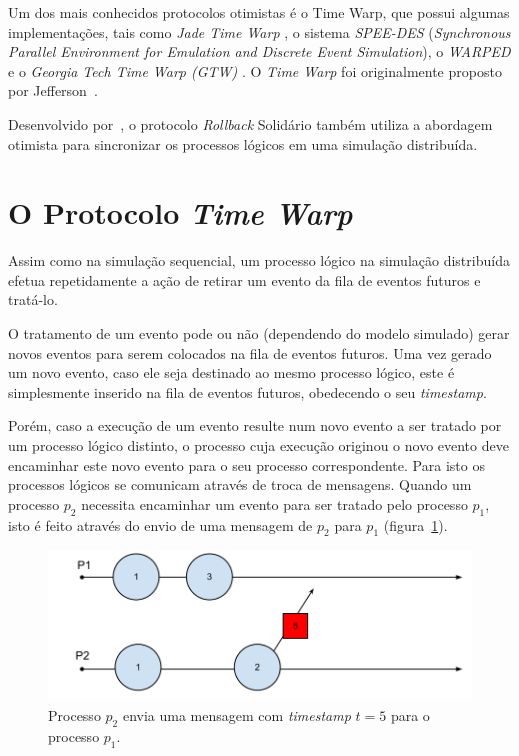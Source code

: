 
Um dos mais conhecidos protocolos otimistas é o Time Warp, que possui algumas implementações, tais como \textit{Jade Time Warp} \cite{BAEZNER1}, o sistema \textit{SPEE-DES} (\textit{Synchronous Parallel Environment for Emulation and Discrete Event Simulation})\cite{STEINMAN92}, o \textit{WARPED} \cite{WARPED} e o \textit{Georgia Tech Time Warp (GTW)} \cite{DAS94}. O \textit{Time Warp} foi originalmente proposto por Jefferson~\cite{JEFFERSON}.

Desenvolvido por~\cite{EDMARMO}, o protocolo \textit{Rollback} Solidário também utiliza a abordagem otimista para sincronizar os processos lógicos em uma simulação distribuída.

\section{O Protocolo \textit{Time Warp}}

Assim como na simulação sequencial, um processo lógico na simulação distribuída efetua repetidamente a ação de retirar um evento da fila de eventos futuros e tratá-lo. 

O tratamento de um evento pode ou não (dependendo do modelo simulado) gerar novos eventos para serem colocados na fila de eventos futuros. Uma vez gerado um novo evento, caso  ele seja destinado ao mesmo processo lógico, este é simplesmente inserido na fila de eventos futuros, obedecendo o seu \textit{timestamp}.

Porém, caso a execução de um evento resulte num novo evento a ser tratado por um processo lógico distinto, o processo cuja execução originou o novo evento deve encaminhar este novo evento para o seu processo correspondente. Para isto os processos lógicos se comunicam através de troca de mensagens. Quando um processo $p_{2}$ necessita encaminhar um evento para ser tratado pelo processo $p_{1}$, isto é feito através do envio de uma mensagem de $p_{2}$ para $p_{1}$ (figura~\ref{fig:envia_mensagem}).

\begin{figure}
  \centerline{\includegraphics[scale=0.4]{envia_mensagem.png}}
  \caption{Processo $p_{2}$ envia uma mensagem com \textit{timestamp} $t=5$ para o processo $p_{1}$.}
\label{fig:envia_mensagem}
\end{figure}

